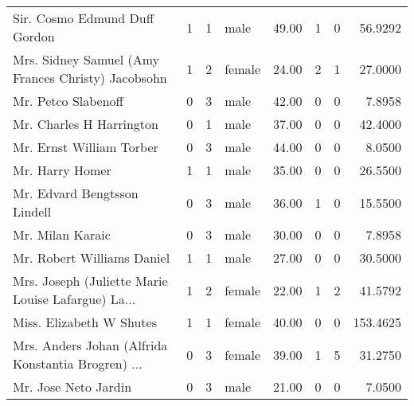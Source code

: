 \begin{tabular}{lrrlrrrr}
Sir. Cosmo Edmund Duff Gordon                      &         1 &       1 &    male &  49.00 &                        1 &                        0 &   56.9292 \\
Mrs. Sidney Samuel (Amy Frances Christy) Jacobsohn &         1 &       2 &  female &  24.00 &                        2 &                        1 &   27.0000 \\
Mr. Petco Slabenoff                                &         0 &       3 &    male &  42.00 &                        0 &                        0 &    7.8958 \\
Mr. Charles H Harrington                           &         0 &       1 &    male &  37.00 &                        0 &                        0 &   42.4000 \\
Mr. Ernst William Torber                           &         0 &       3 &    male &  44.00 &                        0 &                        0 &    8.0500 \\
Mr. Harry Homer                                    &         1 &       1 &    male &  35.00 &                        0 &                        0 &   26.5500 \\
Mr. Edvard Bengtsson Lindell                       &         0 &       3 &    male &  36.00 &                        1 &                        0 &   15.5500 \\
Mr. Milan Karaic                                   &         0 &       3 &    male &  30.00 &                        0 &                        0 &    7.8958 \\
Mr. Robert Williams Daniel                         &         1 &       1 &    male &  27.00 &                        0 &                        0 &   30.5000 \\
Mrs. Joseph (Juliette Marie Louise Lafargue) La... &         1 &       2 &  female &  22.00 &                        1 &                        2 &   41.5792 \\
Miss. Elizabeth W Shutes                           &         1 &       1 &  female &  40.00 &                        0 &                        0 &  153.4625 \\
Mrs. Anders Johan (Alfrida Konstantia Brogren) ... &         0 &       3 &  female &  39.00 &                        1 &                        5 &   31.2750 \\
Mr. Jose Neto Jardin                               &         0 &       3 &    male &  21.00 &                        0 &                        0 &    7.0500 \\

\end{tabular}
